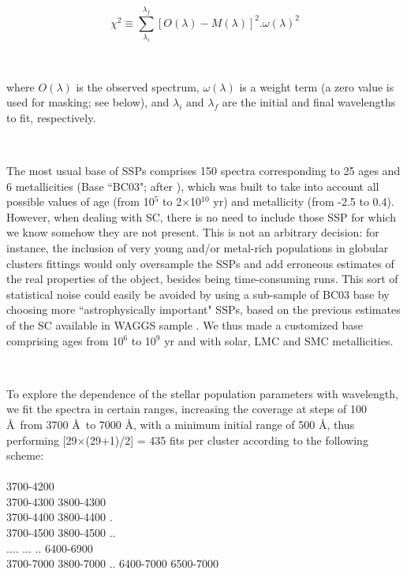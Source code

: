 \documentclass[baaa]{baaa}
\begin{document}
\begin{equation}
\label{eq1}
\chi^2 \equiv \sum_{\lambda_i}^{\lambda_f} [O(\lambda) - M(\lambda)]^2.\omega(\lambda)^2
\end{equation}

\

where $O(\lambda)$ is the observed spectrum, $\omega(\lambda)$ is a weight term (a zero value is used for masking; see below), and $\lambda_i$ and $\lambda_f$ are the initial and final wavelengths to fit, respectively.

\

The most usual base of SSPs comprises 150 spectra corresponding to 25 ages and 6 metallicities (Base ``BC03"; after \citep{BC2003}), which was built to take into account all possible values of age (from 10$^5$ to 2$\times$10$^{10}$ yr) and metallicity (from -2.5 to 0.4). However, when dealing with SC, there is no need to include those SSP for which we know somehow they are not present. This is not an arbitrary decision: for instance, the inclusion of very young and/or metal-rich populations in globular clusters fittings would only oversample the SSPs and add erroneous estimates of the real properties of the object, besides being time-consuming runs. This sort of statistical noise could easily be avoided by using a sub-sample of BC03 base by choosing more ``astrophysically important" SSPs, based on the previous estimates of the SC available in WAGGS sample \citep{WAGGS}. We thus made a customized base comprising ages from 10$^6$ to 10$^9$ yr and with solar, LMC and SMC metallicities.

\



To explore the dependence of the stellar population parameters with wavelength, we fit the spectra in certain ranges, increasing the coverage at steps of 100 \AA\ from 3700 \AA\ to 7000 \AA, with a minimum initial range of 500 \AA, thus performing [29$\times$(29+1)/2] = 435 fits per cluster according to the following scheme:
\\
\\3700-4200 \\
3700-4300 \hspace{0.5cm}	3800-4300 \\
3700-4400 \hspace{0.5cm}	3800-4400 \hspace{0.5cm}	.   \\
3700-4500 \hspace{0.5cm}	3800-4500 \hspace{0.5cm}	..  \\
....      \hspace{1.6cm}		...	  \hspace{1.6cm}	..  \hspace{0.1cm}	6400-6900   \\
3700-7000 \hspace{0.5cm}	3800-7000 \hspace{0.4cm}	..  \hspace{0.1cm}	6400-7000   \hspace{0.2cm}	6500-7000
\end{document}
